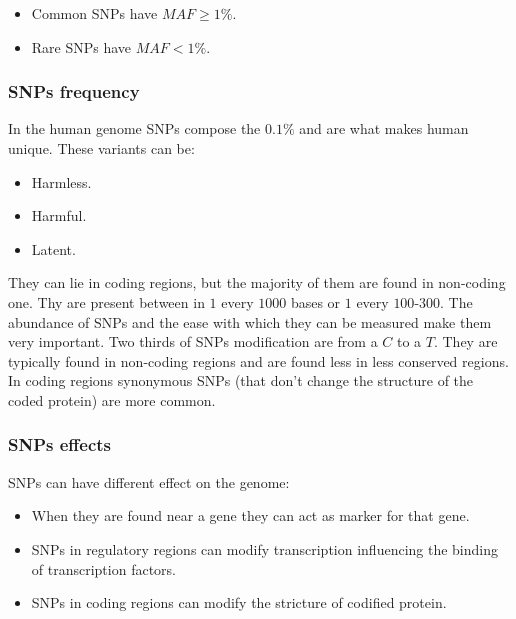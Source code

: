 	\begin{multicols}{2}
		\begin{itemize}
			\item Common SNPs have $MAF \ge 1\%$.
			\item Rare SNPs have $MAF < 1\%$.
		\end{itemize}
	\end{multicols}

		\subsubsection{SNPs frequency}
		In the human genome SNPs compose the $0.1\%$ and are what makes human unique.
		These variants can be:

		\begin{multicols}{3}
			\begin{itemize}
				\item Harmless.
				\item Harmful.
				\item Latent.
			\end{itemize}
		\end{multicols}

		They can lie in coding regions, but the majority of them are found in non-coding one.
		Thy are present between in $1$ every $1000$ bases or $1$ every $100$-$300$.
		The abundance of SNPs and the ease with which they can be measured make them very important.
		Two thirds of SNPs modification are from a $C$ to a $T$.
		They are typically found in non-coding regions and are found less in less conserved regions.
		In coding regions synonymous SNPs (that don't change the structure of the coded protein) are more common.

		\subsubsection{SNPs effects}
		SNPs can have different effect on the genome:

		\begin{multicols}{2}
			\begin{itemize}
				\item When they are found near a gene they can act as marker for that gene.
				\item SNPs in regulatory regions can modify transcription influencing the binding of transcription factors.
				\item SNPs in coding regions can modify the stricture of codified protein.
			\end{itemize}
		\end{multicols}

